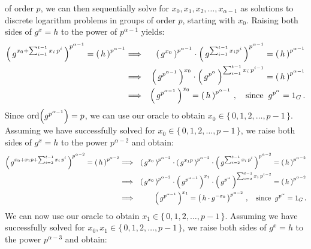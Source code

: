 \begin{itemize}
{		of order $p$, we can then sequentially solve for $x_{0}, x_{1}, x_{2},\ldots,x_{\alpha-1}$ as solutions
		to discrete logarithm problems in groups of order $p$, starting with $x_{0}$.
 		\vskip 0.1cm
		Raising both sides of $g^{x} = h$ to the power of $p^{\alpha-1}$ yields:
		\begin{eqnarray*}
		\left(\,g^{x_{0}+\sum_{i=1}^{t-1}x_{i}\,p^{i}}\,\right)^{p^{\alpha-1}}  = \left(\,h\,\right)^{p^{\alpha-1}}
		&\Longrightarrow& \left(\,g^{x_{0}}\,\right)^{p^{\alpha-1}}
				\cdot\left(\,g^{\sum_{i=1}^{t-1}x_{i}p^{i}}\,\right)^{p^{\alpha-1}}  = \left(\,h\,\right)^{p^{\alpha-1}} \\
		&\Longrightarrow& \left(\,g^{p^{\alpha-1}}\,\right)^{x_{0}}
				\cdot\left(\,g^{p^{\alpha}}\,\right)^{\sum_{i=1}^{t-1}x_{i}\,p^{i-1}}  = \left(\,h\,\right)^{p^{\alpha-1}} \\
		&\Longrightarrow& \left(\,g^{p^{\alpha-1}}\,\right)^{x_{0}} = \left(\,h\,\right)^{p^{\alpha-1}}\,,
			\quad\textnormal{since}\;\; g^{p^{\alpha}} = 1_{G}\,.
		\end{eqnarray*}
		Since $\textnormal{ord}\!\left(g^{p^{\alpha-1}}\right) = p$, we can use our oracle to obtain $x_{0} \in \{\,0,1,2,\ldots,p-1\,\}$.
		\vskip 0.1cm
		Assuming we have successfully solved for $x_{0} \in \{\,0,1,2,\ldots,p-1\,\}$, we raise both sides of $g^{x} = h$
		to the power $p^{\alpha-2}$ and obtain:
		\begin{eqnarray*}
		\left(\,g^{x_{0}+x_{1}p+\sum_{i=2}^{t-1}x_{i}\,p^{i}}\,\right)^{p^{\alpha-2}}  = \left(\,h\,\right)^{p^{\alpha-2}}
		&\Longrightarrow& \left(\,g^{x_{0}}\,\right)^{p^{\alpha-2}} \cdot \left(\,g^{x_{1}p}\,\right)^{p^{\alpha-2}}
				\cdot\left(\,g^{\sum_{i=2}^{t-1}x_{i}\,p^{i}}\,\right)^{p^{\alpha-2}}  = \left(\,h\,\right)^{p^{\alpha-2}} \\
		&\Longrightarrow& \left(\,g^{x_{0}}\,\right)^{p^{\alpha-2}} \cdot \left(\,g^{p^{\alpha-1}}\,\right)^{x_{1}}
				\cdot\left(\,g^{p^{\alpha}}\,\right)^{\sum_{i=2}^{t-1}x_{i}\,p^{i-2}}  = \left(\,h\,\right)^{p^{\alpha-2}} \\
		&\Longrightarrow& \left(\,g^{p^{\alpha-1}}\,\right)^{x_{1}} = \left(\,h\cdot g^{-x_{0}}\,\right)^{p^{\alpha-2}}\,,
			\quad\textnormal{since}\;\; g^{p^{\alpha}} = 1_{G}\,.
		\end{eqnarray*}
		We can now use our oracle to obtain $x_{1} \in \{\,0,1,2,\ldots,p-1\,\}$.
		\vskip 0.1cm
		Assuming we have successfully solved for $x_{0},x_{1} \in \{\,0,1,2,\ldots,p-1\,\}$,
		we raise both sides of $g^{x} = h$ to the power $p^{\alpha-3}$ and obtain:
		\begin{eqnarray*}

\end{eqnarray*}}
\end{itemize}
